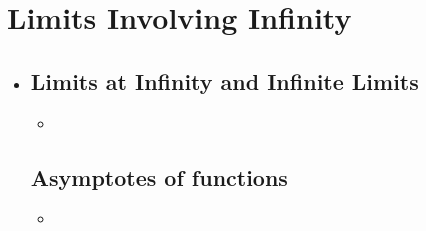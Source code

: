 \section{Limits Involving Infinity}
\begin{itemize}
  \item []

  \subsection{Limits at Infinity and Infinite Limits}
  \begin{itemize}
    \item
  \end{itemize}

  \subsection{Asymptotes of functions}
  \begin{itemize}
    \item
  \end{itemize}

\end{itemize}
